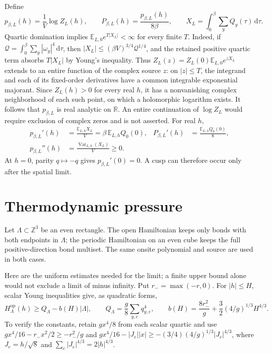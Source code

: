 \documentclass[11pt]{article}
\numberwithin{equation}{section}
\theoremstyle{definition}
\newcommand{\R}{\mathbb R}
\newcommand{\Z}{\mathbb Z}
\newcommand{\E}{\mathbb E}
\newcommand{\dd}{\,\mathrm d}
\newcommand{\Var}{\operatorname{Var}}
\begin{document}
Define
\begin{equation}
 p_{\beta,L}(h)=\frac1V\log Z_L(h),\qquad
 P_{\beta,L}(h)=\frac{p_{\beta,L}(h)}{8\beta},\qquad
 X_L=\int_0^\beta\sum_yQ_y(\tau)\dd\tau.
 \label{eq:pressure-def}
\end{equation}
Quartic domination implies $\E_{L,0}e^{T|X_L|}<\infty$ for every finite
$T$.  Indeed, if $\mathcal Q=\int_0^\beta\sum_y|\omega_y|^4\dd\tau$,
then $|X_L|\leq(\beta V)^{3/4}\mathcal Q^{1/4}$, and the retained positive
quartic term absorbs $T|X_L|$ by Young's inequality.  Thus
$Z_L(z)=Z_L(0)\E_{L,0}e^{zX_L}$ extends to an entire function of the
complex source $z$: on $|z|\leq T$, the integrand and each of its fixed-order
derivatives have a common integrable exponential majorant.  Since
$Z_L(h)>0$ for every real $h$, it has a nonvanishing complex neighborhood
of each such point, on which a holomorphic logarithm exists.  It follows
that $p_{\beta,L}$ is real analytic on $\R$.  An entire continuation of
$\log Z_L$ would require exclusion of complex zeros and is not asserted.
For real $h$,
\begin{align}
 p_{\beta,L}'(h)&=\frac{\E_{L,h}X_L}{V}=\beta\,\E_{L,h}Q_0(0),
 &P_{\beta,L}'(h)&=\frac{\E_{L,h}Q_0(0)}8,\label{eq:source-derivatives}\\
 p_{\beta,L}''(h)&=\frac{\Var_{L,h}(X_L)}V\geq0. \nonumber
\end{align}
At $h=0$, parity $q\mapsto-q$ gives $p_{\beta,L}'(0)=0$.  A cusp can
therefore occur only after the spatial limit.

\section{Thermodynamic pressure}
\label{sec:pressure}

Let $\Lambda\subset\Z^3$ be an even rectangle.  The open Hamiltonian keeps
only bonds with both endpoints in $\Lambda$; the periodic Hamiltonian on an
even cube keeps the full positive-direction bond multiset.  The same onsite
polynomial and source are used in both cases.

Here are the uniform estimates needed for the limit; a finite upper bound
alone would not exclude a limit of minus infinity.  Put $r_-=\max(-r,0)$.
For $|h|\leq H$, scalar Young inequalities give, as quadratic forms,
\begin{equation}
 H_\Lambda^{\mathrm{op}}(h)\geq Q_\Lambda-b(H)|\Lambda|,\qquad
 Q_\Lambda=\frac g8\sum_{y,e}q_{y,e}^4,\qquad
 b(H)=\frac{8r_-^2}{g}+\frac32(4/g)^{1/3}H^{4/3}.
 \label{eq:retained-quartic}
\end{equation}
To verify the constants, retain $gx^4/8$ from each scalar quartic and use
$gx^4/16-r_-x^2/2\geq-r_-^2/g$ and
$gx^4/16-|J_e||x|\geq-(3/4)(4/g)^{1/3}|J_e|^{4/3}$, where
$J_e=h/\sqrt8$ and $\sum_e|J_e|^{4/3}=2|h|^{4/3}$.
\end{document}
